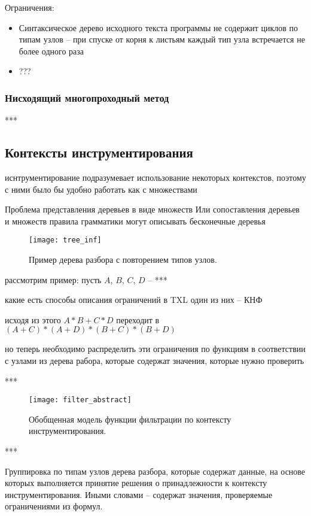 Ограничения:
\begin{itemize}[noitemsep]
  \item Синтаксическое дерево исходного текста программы не содержит циклов по типам узлов -- при спуске от корня к листьям каждый тип узла встречается не более одного раза
  \item ???
\end{itemize}

\subsubsection{Нисходящий многопроходный метод}

***

\subsection{Контексты инструментирования}

иснтрументирование подразумевает использование некоторых контекстов, поэтому с ними было бы удобно работать как с множествами

Проблема представления деревьев в виде множеств
Или сопоставления деревьев и множеств
правила грамматики могут описывать бесконечные деревья

\begin{figure}[H]
	\centering
	\texttt{[image: tree\_inf]}
	\caption{Пример дерева разбора с повторением типов узлов.}
	\label{fig:tree_inf}
\end{figure}

рассмотрим пример: пусть $A$, $B$, $C$, $D$ -- ***

какие есть способы описания ограничений в TXL
один из них -- КНФ

исходя из этого
$A * B + C * D$
переходит в
$(A + C) * (A + D) * (B + C) * (B + D)$

но теперь необходимо распределить эти ограничения по функциям в соответствии с узлами из дерева рабора, которые содержат значения, которые нужно проверить

***

\begin{figure}[H]
	\centering
	\texttt{[image: filter\_abstract]}
	\caption{Обобщенная модель функции фильтрации по контексту инструментирования.}
	\label{fig:filter_abstract}
\end{figure}

***

Группировка по типам узлов дерева разбора, которые содержат данные, на основе которых выполняется принятие решения о принадлежности к контексту инструментирования. Иными словами -- содержат значения, проверяемые ограничениями из формул.

